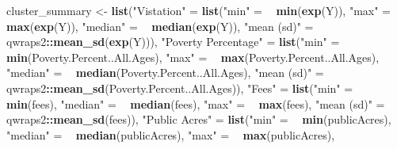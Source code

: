 \documentclass[
]{article}
\newenvironment{Shaded}{\begin{snugshade}}{\end{snugshade}}
\newcommand{\ErrorTok}[1]{\textcolor[rgb]{0.64,0.00,0.00}{\textbf{#1}}}
\newcommand{\KeywordTok}[1]{\textcolor[rgb]{0.13,0.29,0.53}{\textbf{#1}}}
\newcommand{\NormalTok}[1]{#1}
\newcommand{\OperatorTok}[1]{\textcolor[rgb]{0.81,0.36,0.00}{\textbf{#1}}}
\newcommand{\StringTok}[1]{\textcolor[rgb]{0.31,0.60,0.02}{#1}}
\begin{document}
\begin{Shaded}
\begin{Highlighting}[]
\NormalTok{cluster_summary <-}
\StringTok{  }\KeywordTok{list}\NormalTok{(}\StringTok{"Vistation"}\NormalTok{ =}
\StringTok{       }\KeywordTok{list}\NormalTok{(}\StringTok{"min"}\NormalTok{       =}\StringTok{ }\ErrorTok{~}\StringTok{ }\KeywordTok{min}\NormalTok{(}\KeywordTok{exp}\NormalTok{(Y)),}
            \StringTok{"max"}\NormalTok{       =}\StringTok{ }\ErrorTok{~}\StringTok{ }\KeywordTok{max}\NormalTok{(}\KeywordTok{exp}\NormalTok{(Y)),}
            \StringTok{"median"}\NormalTok{    =}\StringTok{ }\ErrorTok{~}\StringTok{ }\KeywordTok{median}\NormalTok{(}\KeywordTok{exp}\NormalTok{(Y)),}
            \StringTok{"mean (sd)"}\NormalTok{ =}\StringTok{ }\ErrorTok{~}\StringTok{ }\NormalTok{qwraps2}\OperatorTok{::}\KeywordTok{mean_sd}\NormalTok{(}\KeywordTok{exp}\NormalTok{(Y))),}
       \StringTok{"Poverty Percentage"}\NormalTok{ =}
\StringTok{       }\KeywordTok{list}\NormalTok{(}\StringTok{"min"}\NormalTok{       =}\StringTok{ }\ErrorTok{~}\StringTok{ }\KeywordTok{min}\NormalTok{(Poverty.Percent..All.Ages),}
            \StringTok{"max"}\NormalTok{       =}\StringTok{ }\ErrorTok{~}\StringTok{ }\KeywordTok{max}\NormalTok{(Poverty.Percent..All.Ages),}
            \StringTok{"median"}\NormalTok{    =}\StringTok{ }\ErrorTok{~}\StringTok{ }\KeywordTok{median}\NormalTok{(Poverty.Percent..All.Ages),}
            \StringTok{"mean (sd)"}\NormalTok{ =}\StringTok{ }\ErrorTok{~}\StringTok{ }\NormalTok{qwraps2}\OperatorTok{::}\KeywordTok{mean_sd}\NormalTok{(Poverty.Percent..All.Ages)),}
       \StringTok{"Fees"}\NormalTok{ =}
\StringTok{       }\KeywordTok{list}\NormalTok{(}\StringTok{"min"}\NormalTok{       =}\StringTok{ }\ErrorTok{~}\StringTok{ }\KeywordTok{min}\NormalTok{(fees),}
            \StringTok{"median"}\NormalTok{    =}\StringTok{ }\ErrorTok{~}\StringTok{ }\KeywordTok{median}\NormalTok{(fees),}
            \StringTok{"max"}\NormalTok{       =}\StringTok{ }\ErrorTok{~}\StringTok{ }\KeywordTok{max}\NormalTok{(fees),}
            \StringTok{"mean (sd)"}\NormalTok{ =}\StringTok{ }\ErrorTok{~}\StringTok{ }\NormalTok{qwraps2}\OperatorTok{::}\KeywordTok{mean_sd}\NormalTok{(fees)),}
       \StringTok{"Public Acres"}\NormalTok{ =}
\StringTok{       }\KeywordTok{list}\NormalTok{(}\StringTok{"min"}\NormalTok{       =}\StringTok{ }\ErrorTok{~}\StringTok{ }\KeywordTok{min}\NormalTok{(publicAcres),}
            \StringTok{"median"}\NormalTok{    =}\StringTok{ }\ErrorTok{~}\StringTok{ }\KeywordTok{median}\NormalTok{(publicAcres),}
            \StringTok{"max"}\NormalTok{       =}\StringTok{ }\ErrorTok{~}\StringTok{ }\KeywordTok{max}\NormalTok{(publicAcres),}

\end{Highlighting}
\end{Shaded}
\end{document}
